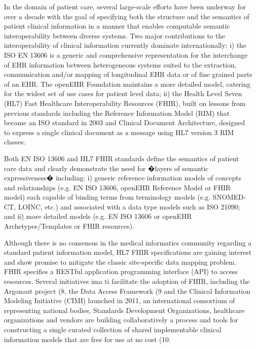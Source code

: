 \documentclass{amia}
\begin{document}
In the domain of patient care, several large-scale efforts have been underway for over a decade with the goal of specifying both the structure and the semantics of patient clinical information in a manner that enables computable semantic interoperability between diverse systems. Two major contributions to the interoperability of clinical information currently dominate internationally: i) the ISO EN 13606 is a generic and comprehensive representation for the interchange of EHR information between heterogeneous systems suited to the extraction, communication and/or mapping of longitudinal EHR data or of fine grained parts of an EHR. The openEHR Foundation maintains a more detailed model, catering for the widest set of use cases for patient level data; ii) the Health Level Seven (HL7) Fast Healthcare Interoperability Resources (FHIR), built on lessons from previous standards including the Reference Information Model (RIM) that became an ISO standard in 2003 and Clinical Document Architecture, designed to express a single clinical document as a message using HL7 version 3 RIM classes.

Both EN ISO 13606 and HL7 FHIR standards define the semantics of patient care data and clearly demonstrate the need for �layers of semantic expressiveness� including: i) generic reference information models of concepts and relationships (e.g. EN ISO 13606, openEHR Reference Model or FHIR model) each capable of binding terms from terminology models (e.g. SNOMED-CT, LOINC, etc.) and associated with a data type models such as ISO 21090; and ii) more detailed models (e.g. EN ISO 13606 or openEHR Archetypes/Templates or FHIR resources). 

Although there is no consensus in the medical informatics community regarding a standard patient information model, HL7 FHIR specifications are gaining interest and show promise to mitigate the classic site-specific data mapping problem. FHIR specifies a RESTful application programming interface (API) to access resources. Several initiatives ima ti facilitate the adoption of FHIR, including the Argonaut project (8, the Data Access Framework (9 and the Clinical Information Modeling Initiative (CIMI) launched in 2011, an international consortium of representing national bodies, Standards Development Organizations, healthcare organizations and vendors are building collaboratively a process and tools for constructing a single curated collection of shared implementable clinical information models that are free for use at no cost (10.
\end{document}
